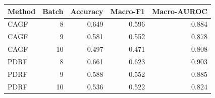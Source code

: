 \begin{tabular}{lrrrr}
\toprule
Method & Batch & Accuracy & Macro-F1 & Macro-AUROC\\
\midrule
CAGF & 8 & 0.649 & 0.596 & 0.884\\
CAGF & 9 & 0.581 & 0.552 & 0.878\\
CAGF & 10 & 0.497 & 0.471 & 0.808\\
PDRF & 8 & 0.661 & 0.623 & 0.903\\
PDRF & 9 & 0.588 & 0.552 & 0.885\\
PDRF & 10 & 0.536 & 0.522 & 0.824\\
\bottomrule
\end{tabular}
